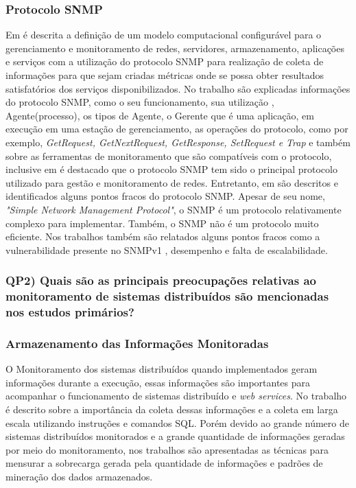 \subsubsection{Protocolo SNMP}
\label{snmpDescription}

Em \cite{deGeus} é descrita a definição de um modelo computacional configurável para o gerenciamento e monitoramento de redes, servidores, armazenamento, aplicações e serviços com a utilização do protocolo SNMP para realização de coleta de informações para que sejam criadas métricas onde se possa obter resultados satisfatórios dos serviços disponibilizados. No  trabalho \cite{daSilva} são explicadas informações do protocolo SNMP, como o seu funcionamento, sua utilização , Agente(processo), os tipos de Agente, o Gerente que é uma aplicação, em execução em uma estação de gerenciamento, as operações do protocolo, como por exemplo, \textit{GetRequest, 	GetNextRequest,  GetResponse,  SetRequest  e Trap} e também sobre as ferramentas de monitoramento que são compatíveis com o protocolo, inclusive em \cite{Fraga} é destacado que o protocolo SNMP tem sido o principal protocolo utilizado para gestão e monitoramento de redes. Entretanto, em \cite{deMello} são descritos e identificados alguns pontos fracos do protocolo \acrshort{SNMP}. Apesar  de  seu  nome,  \textit{"Simple  Network  Management  Protocol"},  o  SNMP  é  um protocolo  relativamente  complexo  para  implementar.  Também,  o  SNMP  não  é  um protocolo muito eficiente. Nos trabalhos \cite{phan2009cryptanalysis,subramanyan2000scalable} também são relatados alguns pontos fracos como a vulnerabilidade presente no SNMPv1 , desempenho e falta de escalabilidade.

\subsubsection{QP2) Quais são as principais preocupações relativas ao monitoramento de sistemas distribuídos são mencionadas nos estudos primários?}

\subsubsection{Armazenamento das Informações Monitoradas}

O Monitoramento dos sistemas distribuídos quando implementados geram informações durante a execução, essas informações são importantes para acompanhar o funcionamento de sistemas distribuído e \textit{web services}. No trabalho \cite{phan2009cryptanalysis} é descrito sobre a importância da coleta dessas informações e a coleta em larga escala utilizando instruções e comandos SQL. Porém devido ao grande número de sistemas distribuídos monitorados e a grande quantidade de informações geradas por meio do monitoramento, nos trabalhos \cite{abdu1996monitoring,hirate2009profiling} são apresentadas as técnicas para mensurar a sobrecarga gerada pela quantidade de informações e padrões de mineração dos dados armazenados.  

